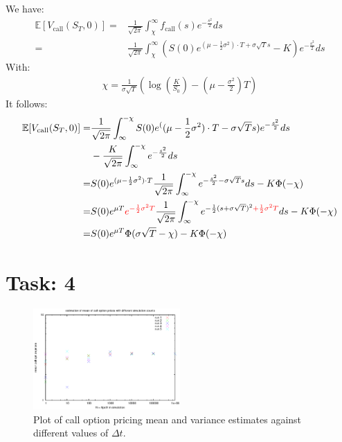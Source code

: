 \documentclass{article}
\begin{document}
\noindent We have:
\begin{align*}
 \mathbb{E}[V_{\text{call}}(S_T,0)] =& \frac{1}{\sqrt{2 \pi}} \int_{\chi}^\infty f_{\text{call}}(s)e^{-\frac{s^2}{2}}ds\\
  =&\frac{1}{\sqrt{2 \pi}} \int_{\chi}^\infty \left( S(0)e^{(\mu-\frac{1}{2}\sigma^2)\cdot T+\sigma\sqrt{T}s}-K\right)e^{-\frac{s^2}{2}}ds
\end{align*}
With:
\begin{align*}
 \chi = \frac{1}{\sigma \sqrt{T}}\left(\log\left(\frac{K}{S_0}\right)-\left(\mu-\frac{\sigma^2}{2}\right)T\right)
\end{align*}
It follows:
\begin{align*}
 \mathbb{E}[V_{\text{call}}(S_T,0)] = & \frac{1}{\sqrt{2 \pi}} \int_{\infty}^{-\chi} S(0)e^((\mu-\frac{1}{2}\sigma^2)\cdot T-\sigma\sqrt{T}s)e^{-\frac{s^2}{2}}ds\\
                                      & - \frac{K}{\sqrt{2 \pi}} \int_{\infty}^{-\chi} e^{-\frac{s^2}{2}}ds\\
                                    = & S(0) e^{(\mu-\frac{1}{2}\sigma^2)\cdot T}\frac{1}{\sqrt{2 \pi}} \int_{\infty}^{-\chi} e^{-\frac{s^2}{2}-\sigma\sqrt{T}s}ds - K \Phi(-\chi)\\
                                    = & S(0) e^{\mu T}\textcolor{red}{e^{-\frac{1}{2}\sigma^2 T}}\frac{1}{\sqrt{2 \pi}} \int_{\infty}^{-\chi} e^{-\frac{1}{2}(s+\sigma\sqrt{T})^2\textcolor{red}{+\frac{1}{2}\sigma^2 T}}ds - K \Phi(-\chi)\\
                                    = & S(0) e^{\mu T} \Phi(\sigma \sqrt{T} - \chi) - K \Phi(-\chi)
\end{align*}
{\flushright{$\qed$}}

\section*{Task: 4}  %
\begin{figure}[htbp]
  \centering
     \includegraphics[width=0.50\textwidth]{../Task04/sh2_task4_plot.eps}
   \caption{Plot of call option pricing mean and variance estimates against different values of $\Delta t$.}
\end{figure}
\end{document}
